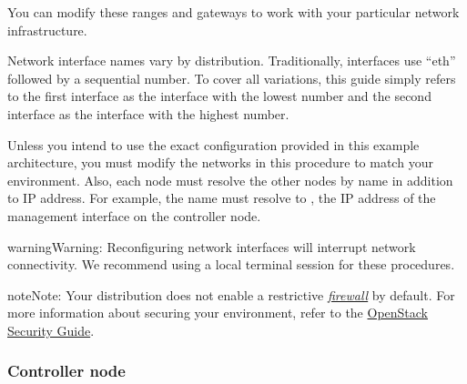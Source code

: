 \documentclass[letterpaper,10pt,english]{sphinxmanual}
\begin{document}
You can modify these ranges and gateways to work with your particular
network infrastructure.

Network interface names vary by distribution. Traditionally,
interfaces use ``eth'' followed by a sequential number. To cover all
variations, this guide simply refers to the first interface as the
interface with the lowest number and the second interface as the
interface with the highest number.

Unless you intend to use the exact configuration provided in this
example architecture, you must modify the networks in this procedure to
match your environment. Also, each node must resolve the other nodes by
name in addition to IP address. For example, the  name must
resolve to , the IP address of the management interface on
the controller node.

\begin{notice}{warning}{Warning:}
Reconfiguring network interfaces will interrupt network
connectivity. We recommend using a local terminal session for these
procedures.
\end{notice}

\begin{notice}{note}{Note:}
Your distribution does not enable a restrictive {\hyperref[_source/glossary:term-firewall]{\emph{firewall}}}
by default. For more information about securing your environment,
refer to the
\href{http://docs.openstack.org/sec/}{OpenStack Security Guide}.
\end{notice}


\subsubsection{Controller node}
\label{_source/installation_guide/environment-networking-controller:controller-node}\label{_source/installation_guide/environment-networking-controller::doc}
\end{document}
